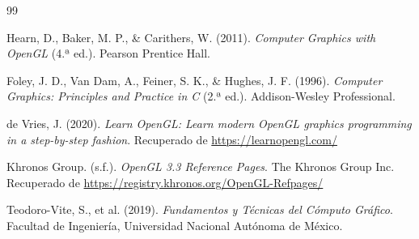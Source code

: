 
\renewcommand{\refname}{Referencias Bibliográficas}
\begin{thebibliography}{99}

Hearn, D., Baker, M. P., \& Carithers, W. (2011). \textit{Computer Graphics with OpenGL} (4.ª ed.). Pearson Prentice Hall.

Foley, J. D., Van Dam, A., Feiner, S. K., \& Hughes, J. F. (1996). \textit{Computer Graphics: Principles and Practice in C} (2.ª ed.). Addison-Wesley Professional.

de Vries, J. (2020). \textit{Learn OpenGL: Learn modern OpenGL graphics programming in a step-by-step fashion}. Recuperado de \url{https://learnopengl.com/}

Khronos Group. (s.f.). \textit{OpenGL 3.3 Reference Pages}. The Khronos Group Inc. Recuperado de \url{https://registry.khronos.org/OpenGL-Refpages/}

Teodoro-Vite, S., et al. (2019). \textit{Fundamentos y Técnicas del Cómputo Gráfico}. Facultad de Ingeniería, Universidad Nacional Autónoma de México.

\end{thebibliography}
